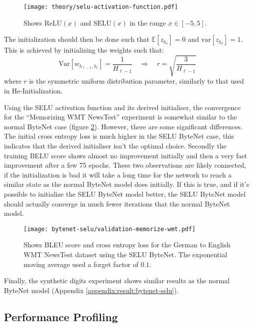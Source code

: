 \begin{figure}[h]
    \centering
    \texttt{[image: theory/selu-activation-function.pdf]}
    \caption{Shows $\mathrm{ReLU}(x)$ and $\mathrm{SELU}(x)$ in the range $x \in [-5, 5]$.}
    \label{fig:result:selu-bytenet:bytenet-selu-activation}
\end{figure}

The initialization should then be done such that $\mathbb{E}[z_{h_\ell}] = 0$ and $\mathrm{var}[z_{h_\ell}] = 1$. This is achieved by initializing the weights such that:
\begin{equation}
\mathrm{Var}[w_{h_{\ell-1}, h_{\ell}}] = \frac{1}{H_{\ell-1}} \quad \Rightarrow \quad r = \sqrt{\frac{3}{H_{\ell-1}}}
\end{equation}
where $r$ is the symmetric uniform distribution parameter, similarly to that used in He-Initialization.

Using the SELU activation function and its derived initialiser, the convergence for the ``Memorizing WMT NewsTest'' experiment is somewhat similar to the normal ByteNet case (figure \ref{fig:result:selu-bytenet:bytenet-selu-wmt}). However, there are some significant differences. The initial cross entropy loss is much higher in the SELU ByteNet case, this indicates that the derived initialiser isn't the optimal choice. Secondly the training BELU score shows almost no improvement initially and then a very fast improvement after a few 75 epochs. These two observations are likely connected, if the initialization is bad it will take a long time for the network to reach a similar state as the normal ByteNet model does initially. If this is true, and if it's possible to initialize the SELU ByteNet model better, the SELU ByteNet model should actually converge in much fewer iterations that the normal ByteNet model.

\begin{figure}[h]
    \centering
    \texttt{[image: bytenet-selu/validation-memorize-wmt.pdf]}
    \caption{Shows BLEU score and cross entropy loss for the German to English WMT NewsTest dataset using the SELU ByteNet. The exponential moving average used a forget factor of $0.1$.}
    \label{fig:result:selu-bytenet:bytenet-selu-wmt}
\end{figure}

Finally, the synthetic digits experiment shows similar results as the normal ByteNet model (Appendix \ref{appendix:result:bytenet-selu}).

\clearpage
\subsection{Performance Profiling}

